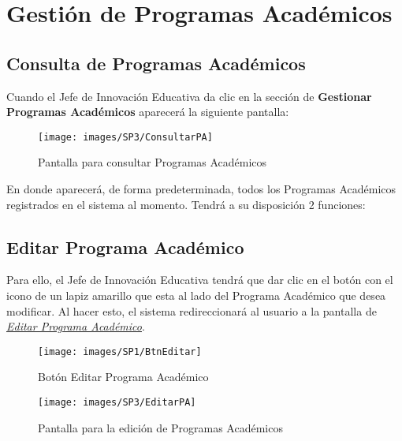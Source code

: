 
\chapter{Gestión de Programas Académicos}
    \section{Consulta de Programas Académicos}
        Cuando el Jefe de Innovación Educativa da clic en la sección de \textbf{Gestionar Programas Académicos} aparecerá la siguiente pantalla:


        \begin{figure}[!hbtp]
        	\centering
        	\hypertarget{consultarpa}{\texttt{[image: images/SP3/ConsultarPA]}}
        	\caption{Pantalla para consultar Programas Académicos}
        	\label{consultarpa}
        \end{figure}

        En donde aparecerá, de forma predeterminada, todos los Programas Académicos  registrados en el sistema al momento. Tendrá a su disposición 2 funciones:

	    \section{Editar Programa Académico}

        	Para ello, el Jefe de Innovación Educativa tendrá que dar clic en el botón con el icono de un lapiz amarillo que esta al lado del Programa Académico que desea modificar. Al hacer esto, el sistema redireccionará al usuario a la pantalla de \hyperlink{editarpa}{\textit{Editar Programa Académico}}.

        	\begin{figure}[!hbtp]
        		\centering
        		\hypertarget{editar}{\texttt{[image: images/SP1/BtnEditar]}}
        		\caption{Botón Editar Programa Académico}
        		\label{editar}
        	\end{figure}

        \begin{figure}[!hbtp]
        	\centering
        	\hypertarget{editarpa}{\texttt{[image: images/SP3/EditarPA]}}
        	\caption{Pantalla para la edición de Programas Académicos}
        	\label{editarpa}
        \end{figure}

